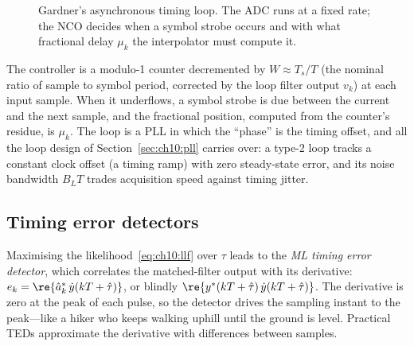 \begin{figure}[htbp]\centering
{}
\caption{Gardner's asynchronous timing loop. The ADC runs at a fixed rate; the NCO decides when a
symbol strobe occurs and with what fractional delay $\mu_k$ the interpolator must compute it.}
\label{fig:ch10_timing_loop}
\end{figure}

The controller is a modulo-1 counter decremented by $W\approx T_s/T$ (the nominal ratio of sample to
symbol period, corrected by the loop filter output $v_k$) at each input sample. When it underflows, a
symbol strobe is due between the current and the next sample, and the fractional position, computed
from the counter's residue, is $\mu_k$. The loop is a PLL in which the ``phase'' is the timing
offset, and all the loop design of Section~\ref{sec:ch10:pll} carries over: a type-2 loop tracks a
constant clock offset (a timing ramp) with zero steady-state error, and its noise bandwidth $B_LT$
trades acquisition speed against timing jitter.

\subsection{Timing error detectors}

Maximising the likelihood~\eqref{eq:ch10:llf} over $\tau$ leads to the \emph{ML timing error
detector}, which correlates the matched-filter output with its derivative:
$e_k=\re\{\hat a_k^*\,\dot y(kT+\hat\tau)\}$, or blindly $\re\{y^*(kT+\hat\tau)\,\dot y(kT+\hat\tau)\}$.
The derivative is zero at the peak of each pulse, so the detector drives the sampling instant to the
peak---like a hiker who keeps walking uphill until the ground is level. Practical TEDs approximate
the derivative with differences between samples.

